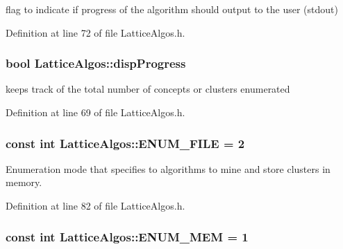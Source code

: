 flag to indicate if progress of the algorithm should output to the user (stdout) 



Definition at line 72 of file LatticeAlgos.h.

\hypertarget{class_lattice_algos_a7c599d38a3a66b926d7345153ca2e93c}{
\subsubsection[{dispProgress}]{\setlength{\rightskip}{0pt plus 5cm}bool {\bf LatticeAlgos::dispProgress}}}
\label{class_lattice_algos_a7c599d38a3a66b926d7345153ca2e93c}


keeps track of the total number of concepts or clusters enumerated 



Definition at line 69 of file LatticeAlgos.h.

\hypertarget{class_lattice_algos_a824804a33640782553f2b399b28fde13}{
\subsubsection[{ENUM\_\-FILE}]{\setlength{\rightskip}{0pt plus 5cm}const int {\bf LatticeAlgos::ENUM\_\-FILE} = 2}}
\label{class_lattice_algos_a824804a33640782553f2b399b28fde13}


Enumeration mode that specifies to algorithms to mine and store clusters in memory. 



Definition at line 82 of file LatticeAlgos.h.

\hypertarget{class_lattice_algos_a80df6360d3246d74ae31e51e6c4bfa0e}{
\subsubsection[{ENUM\_\-MEM}]{\setlength{\rightskip}{0pt plus 5cm}const int {\bf LatticeAlgos::ENUM\_\-MEM} = 1}}
\label{class_lattice_algos_a80df6360d3246d74ae31e51e6c4bfa0e}


